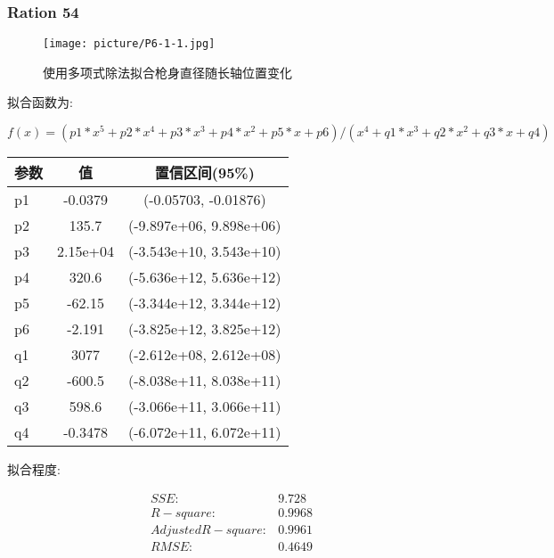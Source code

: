 \documentclass[UTF8]{ctexart}
\begin{document}
			\subsubsection{Ration 54}
					\begin{figure}[h]
							\texttt{[image: picture/P6-1-1.jpg]}
							\caption{使用多项式除法拟合枪身直径随长轴位置变化}
					\end{figure}
					\begin{flushleft}
						拟合函数为:
					\end{flushleft}
					\begin{center}
						\[ f(x) =(p1*x^5 + p2*x^4 + p3*x^3 + p4*x^2 + p5*x + p6)/
						(x^4 + q1*x^3 + q2*x^2 + q3*x + q4)
						\]
					\end{center}
					\begin{center}
					\begin{tabular}{|l|c|c|}
						\hline
						参数&值&置信区间(95\%)\\
						\hline
						p1 & -0.0379 &  (-0.05703, -0.01876)\\
						\hline
						p2 & 135.7&  (-9.897e+06, 9.898e+06)\\
						\hline
						p3 & 2.15e+04&  (-3.543e+10, 3.543e+10)\\
						\hline
						p4 & 320.6&  (-5.636e+12, 5.636e+12)\\
						\hline
						p5 & -62.15&  (-3.344e+12, 3.344e+12)\\
						\hline
						p6 & -2.191&  (-3.825e+12, 3.825e+12)\\
						\hline
						q1 & 3077&  (-2.612e+08, 2.612e+08)\\
						\hline
						q2 & -600.5&  (-8.038e+11, 8.038e+11)\\
						\hline
						q3 & 598.6&  (-3.066e+11, 3.066e+11)\\
						\hline
						q4 & -0.3478&  (-6.072e+11, 6.072e+11)\\
						\hline
					\end{tabular}
				\end{center}
			\begin{flushleft}
				拟合程度:
			\end{flushleft}
				\begin{center}
					$$
					\begin{matrix}
						SSE:&9.728\\
						R-square:&0.9968\\
						Adjusted R-square:&0.9961\\
						RMSE:&0.4649\\
					\end{matrix}
					$$
				\end{center}
\end{document}
